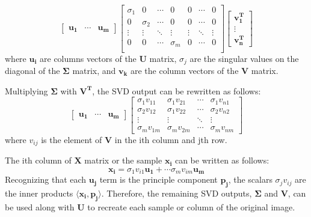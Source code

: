 \documentclass[conference]{IEEEtran}
\begin{document}
	\begin{equation}
		\begin{bmatrix}
			\mathbf{u_1} & \cdots & \mathbf{u_m}
		\end{bmatrix}\begin{bmatrix}
			\sigma_1 & 0 & \cdots & 0 & 0 & \cdots & 0\\
			0 & \sigma_2 & \cdots & 0 & 0 & \cdots & 0\\
			\vdots & \vdots & \ddots & \vdots & \vdots & \ddots & \vdots\\
			0 & 0 & \cdots & \sigma_m & 0 & \cdots & 0\\		
		\end{bmatrix}\begin{bmatrix}
			\mathbf{v_{1}^{T}}\\
			\vdots\\
			\mathbf{v_{n}^{T}}
		\end{bmatrix}		
	\end{equation}
	where $\mathbf{u_i}$ are columns vectors of the $\mathbf{U}$ matrix, $\sigma_j$ are the singular values on the diagonal of the $\mathbf{\Sigma}$ matrix, and $\mathbf{v_k}$ are the column vectors of the $\mathbf{V}$ matrix.
	  
	Multiplying $\mathbf{\Sigma}$ with $\mathbf{V^T}$, the SVD output can be rewritten as follows:
	\begin{equation}
		\begin{bmatrix}
			\mathbf{u_1} & \cdots & \mathbf{u_m}
		\end{bmatrix}\begin{bmatrix}
			\sigma_1v_{11} & \sigma_1v_{21} & \cdots & \sigma_1v_{n1}\\
			\sigma_2v_{12} & \sigma_1v_{22} & \cdots & \sigma_2v_{n2}\\
			\vdots & \vdots & \ddots & \vdots\\
			\sigma_mv_{1m} & \sigma_mv_{2m} & \cdots & \sigma_mv_{nm}
		\end{bmatrix}
	\end{equation}
    	where $v_{ij}$ is the element of $\mathbf{V}$ in the ith column and jth row.
    	
    	The ith column of $\mathbf{X}$ matrix or the sample $\mathbf{x_i}$ can be written as follows:
	\begin{equation*}
		\mathbf{x_i} = \sigma_1v_{i1}\mathbf{u_1} + \cdots \sigma_mv_{im}\mathbf{u_m}
	\end{equation*}   	
    	Recognizing that each $\mathbf{u_j}$ term is the principle component $\mathbf{p_j}$, the scalars $\sigma_jv_{ij}$ are the inner products $\langle \mathbf{x_i}, \mathbf{p_j}\rangle$. Therefore, the remaining SVD outputs, $\mathbf{\Sigma}$ and $\mathbf{V}$, can be used along with $\mathbf{U}$ to recreate each sample or column of the original image.  
    	
\end{document}
